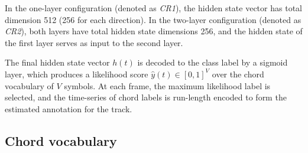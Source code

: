 \documentclass{article}
\begin{document}

In the one-layer configuration (denoted as \emph{CR1}), the hidden state vector has total dimension 512 (256 for each direction).
In the two-layer configuration (denoted as \emph{CR2}), both layers have total hidden state dimensions 256, and the hidden state of the first layer serves as input to the second layer.


The final hidden state vector $h(t)$ is decoded to the class label by a sigmoid layer, which produces a likelihood score $\hat{y}(t) \in [0, 1]^{V}$ over the chord vocabulary of $V$ symbols.
At each frame, the maximum likelihood label is selected, and the time-series of chord labels is run-length encoded to form the estimated annotation for the track.










\subsection{Chord vocabulary}

\label{sec:vocab}
%
\end{document}

